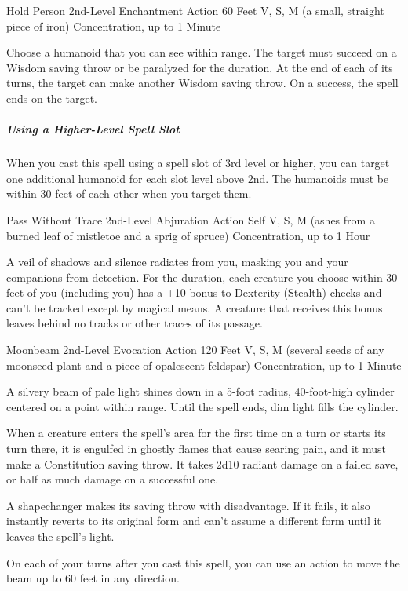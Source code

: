 \documentclass[letterpaper,openany,oneside,twocolumn]{book}
\begin{document}
\DndSpellHeader
  {Hold Person}
  {2nd-Level Enchantment}
  {Action}
  {60 Feet}
  {V, S, M (a small, straight piece of iron)}
  {Concentration, up to 1 Minute}

Choose a humanoid that you can see within range. The target must succeed on a Wisdom saving throw or be paralyzed for the duration. At the end of each of its turns, the target can make another Wisdom saving throw. On a success, the spell ends on the target.

\subparagraph*{Using a Higher-Level Spell Slot} When you cast this spell using a spell slot of 3rd level or higher, you can target one additional humanoid for each slot level above 2nd. The humanoids must be within 30 feet of each other when you target them.

\DndSpellHeader
  {Pass Without Trace}
  {2nd-Level Abjuration}
  {Action}
  {Self}
  {V, S, M (ashes from a burned leaf of mistletoe and a sprig of spruce)}
  {Concentration, up to 1 Hour}

A veil of shadows and silence radiates from you, masking you and your companions from detection. For the duration, each creature you choose within 30 feet of you (including you) has a +10 bonus to Dexterity (Stealth) checks and can't be tracked except by magical means. A creature that receives this bonus leaves behind no tracks or other traces of its passage.

\DndSpellHeader
  {Moonbeam}
  {2nd-Level Evocation}
  {Action}
  {120 Feet}
  {V, S, M (several seeds of any moonseed plant and a piece of opalescent feldspar)}
  {Concentration, up to 1 Minute}

A silvery beam of pale light shines down in a 5-foot radius, 40-foot-high cylinder centered on a point within range. Until the spell ends, dim light fills the cylinder.

When a creature enters the spell's area for the first time on a turn or starts its turn there, it is engulfed in ghostly flames that cause searing pain, and it must make a Constitution saving throw. It takes 2d10 radiant damage on a failed save, or half as much damage on a successful one.

A shapechanger makes its saving throw with disadvantage. If it fails, it also instantly reverts to its original form and can't assume a different form until it leaves the spell's light.

On each of your turns after you cast this spell, you can use an action to move the beam up to 60 feet in any direction.
\end{document}
